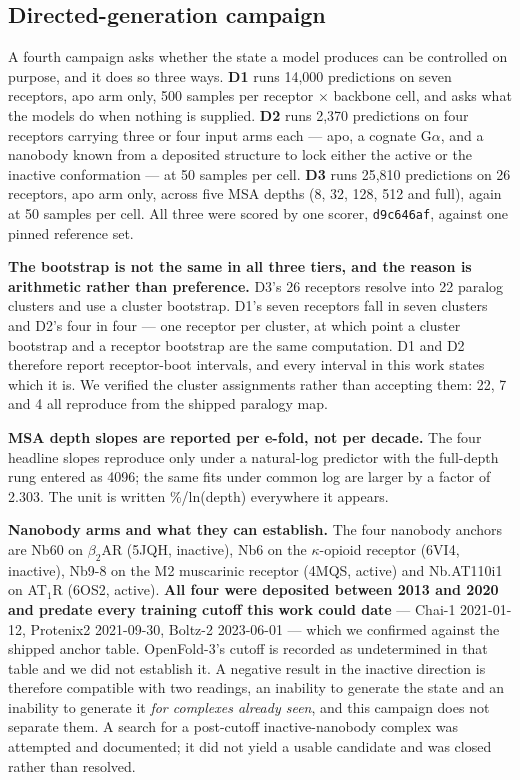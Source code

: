 \subsection*{Directed-generation campaign}

A fourth campaign asks whether the state a model produces can be controlled on
purpose, and it does so three ways. \textbf{D1} runs 14{,}000 predictions on
seven receptors, apo arm only, 500 samples per receptor $\times$ backbone cell,
and asks what the models do when nothing is supplied. \textbf{D2} runs 2{,}370
predictions on four receptors carrying three or four input arms each --- apo, a
cognate G$\alpha$, and a nanobody known from a deposited structure to lock
either the active or the inactive conformation --- at 50 samples per cell.
\textbf{D3} runs 25{,}810 predictions on 26 receptors, apo arm only, across five
MSA depths (8, 32, 128, 512 and full), again at 50 samples per cell. All three
were scored by one scorer, \texttt{d9c646af}, against one pinned reference set.

\textbf{The bootstrap is not the same in all three tiers, and the reason is
arithmetic rather than preference.} D3's 26 receptors resolve into 22 paralog
clusters and use a cluster bootstrap. D1's seven receptors fall in seven
clusters and D2's four in four --- one receptor per cluster, at which point a
cluster bootstrap and a receptor bootstrap are the same computation. D1 and D2
therefore report receptor-boot intervals, and every interval in this work states
which it is. We verified the cluster assignments rather than accepting them:
22, 7 and 4 all reproduce from the shipped paralogy map.

\textbf{MSA depth slopes are reported per e-fold, not per decade.} The four
headline slopes reproduce only under a natural-log predictor with the full-depth
rung entered as 4096; the same fits under common log are larger by a factor of
2.303. The unit is written \%/ln(depth) everywhere it appears.

\textbf{Nanobody arms and what they can establish.} The four nanobody anchors
are Nb60 on $\beta_2$AR (5JQH, inactive), Nb6 on the $\kappa$-opioid receptor
(6VI4, inactive), Nb9-8 on the M2 muscarinic receptor (4MQS, active) and
Nb.AT110i1 on AT$_1$R (6OS2, active). \textbf{All four were deposited between
2013 and 2020 and predate every training cutoff this work could date} ---
Chai-1 2021-01-12, Protenix2 2021-09-30, Boltz-2 2023-06-01 --- which we
confirmed against the shipped anchor table. OpenFold-3's cutoff is recorded as
undetermined in that table and we did not establish it. A negative result in the
inactive direction is therefore compatible with two readings, an inability to
generate the state and an inability to generate it \emph{for complexes already
seen}, and this campaign does not separate them. A search for a post-cutoff
inactive-nanobody complex was attempted and documented; it did not yield a
usable candidate and was closed rather than resolved.

